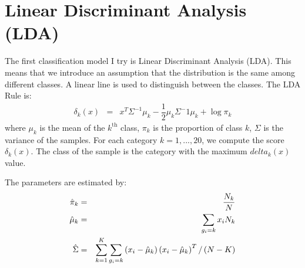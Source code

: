 \section{Linear Discriminant Analysis (LDA)}
\label{sec:lda}

The first classification model I try is Linear Discriminant Analysis (LDA).
This means that we introduce an assumption that the distribution is the same among different classes.
A linear line is used to distinguish between the classes.
The LDA Rule is:
\begin{eqnarray}
    \delta_k\left(x\right) & = & x^T\Sigma^{-1}\mu_k - \dfrac{1}{2}\mu_k\Sigma^-1\mu_k+\log\pi_k
    \label{eqn:lda-rule}
\end{eqnarray}
where $\mu_k$ is the mean of the $k^{\mathrm{th}}$ class, $\pi_k$ is the proportion of class $k$, $\Sigma$ is the variance of the samples.
For each category $k=1,...,20$, we compute the score $\delta_k(x)$.
The class of the sample is the category with the maximum $delta_k(x)$ value.

The parameters are estimated by:
\begin{eqnarray}
    \hat{\pi}_k & = & \dfrac{N_k}{N} \\
    \hat{\mu}_k & = & \sum_{g_i=k}x_i\/N_k \\
    \hat{\Sigma} & = & \sum_{k=1}^{K}\sum_{g_i=k} \left(x_i-\hat{\mu}_k\right)\left(x_i-\hat{\mu}_k\right)^T / \left(N-K\right)
\end{eqnarray}
